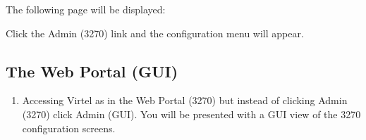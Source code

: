 \documentclass[letterpaper,10pt,english]{sphinxmanual}
\begin{document}
\begin{sphinxVerbatim}[commandchars=\\\{\}]
\end{sphinxVerbatim}

\sphinxAtStartPar
The following page will be displayed:\sphinxhyphen{}

\sphinxAtStartPar
{}

\sphinxAtStartPar
Click the Admin (3270) link and the configuration menu will appear.

\sphinxAtStartPar
{}

\newpage


\subsection{The Web Portal (GUI)}
\label{\detokenize{connectivity_guide:the-web-portal-gui}}\begin{enumerate}
%
\setcounter{enumi}{2}
\item {} 
\sphinxAtStartPar
Accessing Virtel as in the Web Portal (3270) but instead of clicking Admin (3270) click Admin (GUI). You will be presented with a GUI view of the 3270 configuration screens.

\end{enumerate}

\sphinxAtStartPar
{}

\newpage
\end{document}
